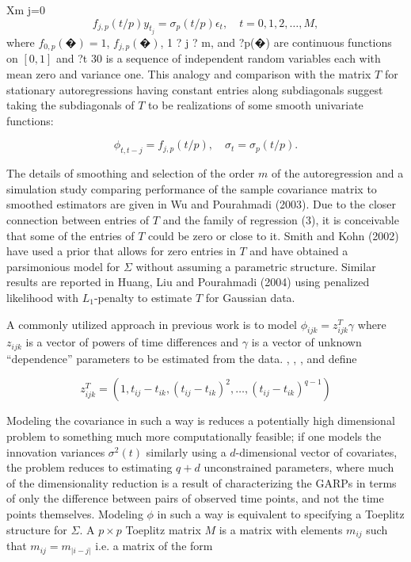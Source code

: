 \documentclass[12pt]{article}
\theoremstyle{definition}
\begin{document}
{{{{{Xm
j=0
\begin{equation}
f_{j,p}\left(t/p\right)y_{t_j} = \sigma_p\left(t/p\right)\epsilon_t, \quad t = 0, 1, 2, \dots, M,
\end{equation}
\noindent
where $f_{0,p}\left(�\right) = 1$, $f_{j,p}\left(�\right)$, 1 ? j ? m, and ?p(�) are continuous functions on $\left[0, 1\right]$ and {?t}
30 is a sequence of independent random variables each with mean zero and variance one. This analogy and comparison with the matrix $T$ for stationary autoregressions having constant
entries along subdiagonals suggest taking the subdiagonals of $T$ to be realizations of some smooth univariate functions:

\begin{equation*}
\phi_{t,t-j} = f_{j,p}\left(t/p\right),\quad \sigma_t = \sigma_p\left(t/p\right). 
\end{equation*}

The details of smoothing and selection of the order $m$ of the autoregression and a simulation study comparing performance of the sample covariance matrix to smoothed estimators are given in Wu and Pourahmadi (2003). Due to the closer connection between entries of $T$ and the family of regression (3), it is conceivable that some of the entries of $T$ could be zero or close to it. Smith and Kohn (2002) have used a prior that allows for zero entries in $T$ and have obtained a parsimonious model for $\Sigma$ without assuming a parametric structure. Similar results are reported in Huang, Liu and Pourahmadi (2004) using penalized likelihood with $L_1$-penalty to estimate $T$ for Gaussian data.}
 A commonly utilized approach in previous work is to model $\phi_{ijk} = z_{ijk}^T \gamma$ where $z_{ijk}$ is a vector of powers of time differences and $\gamma$ is a vector of unknown ``dependence'' parameters to be estimated from the data. \citet{chen2011efficient}, \citet{lin2009robust}, \citet{pan2003modelling},  and \citet{pourahmadi1999joint} define

\begin{equation}
z_{ijk}^T = \left(1, t_{ij} - t_{ik},\left( t_{ij} - t_{ik} \right)^2, \dots, \left(t_{ij} - t_{ik}\right)^{q-1} \right) \label{covmodel}
\end{equation}

Modeling the covariance in such a way is reduces a potentially high dimensional problem to something much more computationally feasible; if one models the innovation variances $\sigma^2\left(t\right)$ similarly using a $d$-dimensional vector of covariates, the problem reduces to estimating $q+d$ unconstrained parameters, where much of the dimensionality reduction is a result of characterizing the GARPs in terms of only the difference between pairs of observed time points, and not the time points themselves.  Modeling $\phi$ in such a way is equivalent to specifying a Toeplitz structure for $\Sigma$. A $p \times p$ Toeplitz matrix $M$ is a matrix with elements $m_{ij}$ such that $m_{ij} = m_{\vert i-j \vert}$ i.e. a matrix of the form


}}}}
\end{document}
